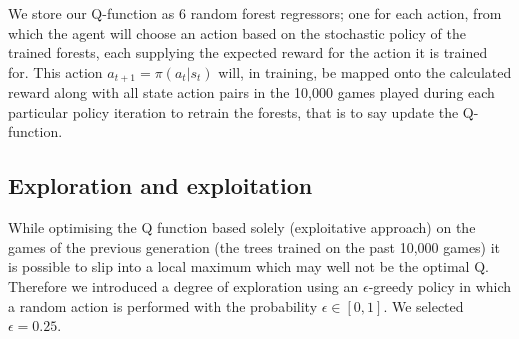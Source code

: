 	We store our Q-function as $6$ random forest regressors; one for each action, from which the agent will choose an action based on the stochastic policy of the trained forests, each supplying the expected reward for the action it is trained for. This action $a_{t+1} = \pi(a_t|s_t)$ will, in training, be mapped onto the calculated reward along with all state action pairs in the 10,000 games played during each particular policy iteration to retrain the forests, that is to say update the Q-function.
	
	
	\subsection{Exploration and exploitation}
	\label{explo}
	While optimising the Q function based solely (exploitative approach) on the games of the previous generation (the trees trained on the past 10,000 games) it is possible to slip into a local maximum which may well not be the optimal Q. Therefore we introduced a degree of exploration using an $\epsilon$-greedy policy in which a random action is performed with the probability $\epsilon \in [0,1]$. We selected $\epsilon = 0.25$. \par
	
